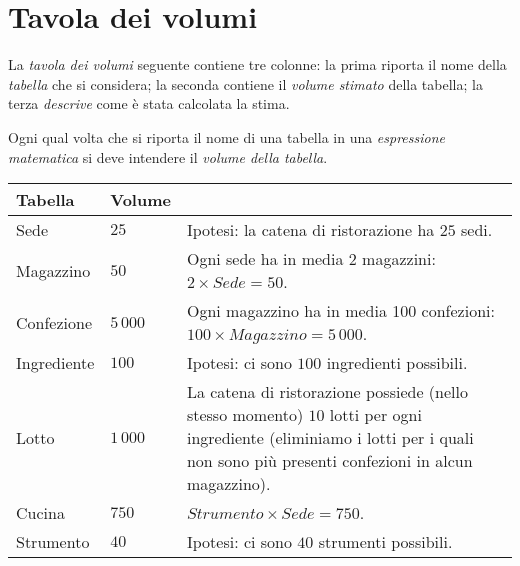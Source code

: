 \section{Tavola dei volumi}\label{sec:volumetable}
La {\it tavola dei volumi} seguente contiene tre colonne: la prima riporta il nome della
{\it tabella} che si considera; la seconda contiene il {\it volume stimato} della tabella; la terza
{\it descrive} come è stata calcolata la stima.

Ogni qual volta che si riporta il nome di una tabella in una {\it espressione matematica} si deve
intendere il {\it volume della tabella}.

{\tabulinesep=3pt
\begin{longtabu} to 
\hline\rowfont\bfseries
{\Large Tabella}& Volume        & 
\\ \hline \hline \hline \hline \hline %
\endhead
Sede            & \(25\)        & Ipotesi: la catena di ristorazione ha \(25\) sedi.
    \\ \hline %
Magazzino       & \(50\)        & Ogni sede ha in media 2 magazzini: \(2 \times Sede = 50\).
    \\ \hline %
Confezione      & \(5\,000\)    & Ogni magazzino ha in media 100 confezioni: \(100 \times Magazzino = 5\,000\).
    \\ \hline %
Ingrediente     & \(100\)       & Ipotesi: ci sono \(100\) ingredienti possibili.
    \\ \hline %
Lotto           & \(1\,000\)    & La catena di ristorazione possiede (nello stesso momento) \(10\)
                                  lotti per ogni ingrediente (eliminiamo i lotti per i quali
                                  non sono più presenti confezioni in alcun magazzino).
    \\ \hline %
Cucina          & \(750\)       & \(Strumento \times Sede = 750\).
    \\ \hline %
Strumento       & \(40\)        & Ipotesi: ci sono \(40\) strumenti possibili.
    \\ \hline %

\end{longtabu}}
